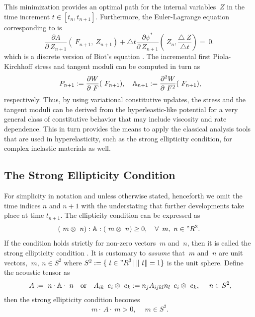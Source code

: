 \documentclass[12pt]{article}
\numberwithin{equation}{section}
\begin{document}
This minimization provides an optimal path for the internal variables
$~Z$ in the time increment $t \in [t_n, t_{n+1}]$. Furthermore, the
Euler-Lagrange equation corresponding to
 is
\begin{equation} \label{eq:Biots-equation-discrete}
  \frac{\partial A}{\partial ~Z_{n+1}}(~F_{n+1}, ~Z_{n+1})
  +
  \triangle t
  \frac{\partial \psi^*}{\partial ~Z_{n+1}}
  \left(~Z_n, \frac{\triangle ~Z}{\triangle t}\right)
  =
  ~0.
\end{equation}
which is a discrete version of Biot's equation
 \citep{Miehe.etal:2002}. The
incremental first Piola-Kirchhoff stress and tangent moduli can be
computed in turn as
\begin{equation} \label{eq:incremental-stress-moduli}
  ~P_{n+1} := \frac{\partial W}{\partial ~F} (~F_{n+1}),
  \quad
  \mathbb{A}_{n+1} := \frac{\partial^2 W}{\partial ~F^2} (~F_{n+1}),
\end{equation}
respectively. Thus, by using variational constitutive updates, the
stress and the tangent moduli can be derived from the
hyperleastic-like potential  for
a very general class of constitutive behavior that may include
viscosity and rate dependence. This in turn provides the means to
apply the classical analysis tools that are used in hyperelasticity,
such as the strong ellipticity condition, for complex inelastic
materials as well.

\subsection{The Strong Ellipticity Condition}

For simplicity in notation and unless otherwise stated, henceforth we
omit the time indices $n$ and $n+1$ with the understating that further
developments take place at time $t_{n+1}$.  The ellipticity condition
can be expressed as
\begin{equation} \label{eq:strong-ellipticity}
  (~m \otimes ~n) : \mathbb{A} : (~m \otimes ~n) \ge 0,
  \quad
  \forall \, ~m, ~n \in {"R}^3.
\end{equation}
If the condition holds strictly for non-zero vectors $~m$ and $~n$,
then it is called the strong ellipticity condition
\citep{Hadamard:1903, Truesdell.Noll:2004, Miehe.etal:2004}. It is
customary to \emph{assume} that $~m$ and $~n$ are unit vectors, \ie
$~m, ~n \in S^2$ where $S^2 := \{ ~t \in {"R}^3 \, | \, \| ~t \| =
1\}$ is the unit sphere. Define the acoustic tensor as
\begin{equation} \label{eq:acoustic-tensor}
  ~A := ~n \cdot \mathbb{A} \cdot ~n
  \quad \text{or} \quad
  A_{ik} \, ~e_i \otimes ~e_k := n_j A_{ijkl} n_l \, ~e_i \otimes ~e_k,
  \quad
  ~n \in S^2,
\end{equation}
then the strong ellipticity condition becomes
\begin{equation} \label{eq:acoustic-ellipticity}
  ~m \cdot ~A \cdot ~m > 0, \quad ~m \in S^2.
\end{equation}
\end{document}
